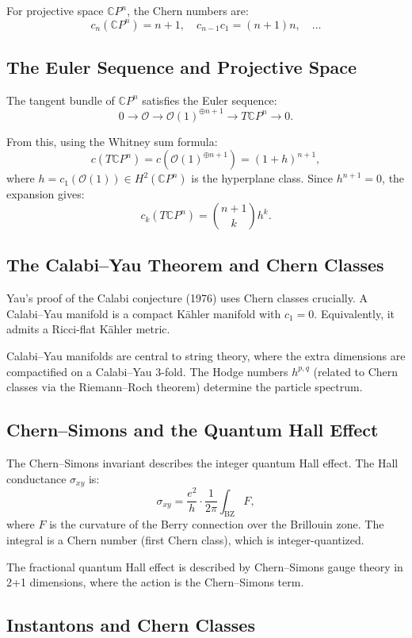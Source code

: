 For projective space $\mathbb{C}P^n$, the Chern numbers are:
\[
c_n(\mathbb{C}P^n) = n+1, \quad c_{n-1}c_1 = (n+1)n, \quad \ldots
\]

\subsection{The Euler Sequence and Projective Space}

The tangent bundle of $\mathbb{C}P^n$ satisfies the Euler sequence:
\[
0 \to \mathcal{O} \to \mathcal{O}(1)^{\oplus n+1} \to T\mathbb{C}P^n \to 0.
\]

From this, using the Whitney sum formula:
\[
c(T\mathbb{C}P^n) = c(\mathcal{O}(1)^{\oplus n+1}) = (1 + h)^{n+1},
\]
where $h = c_1(\mathcal{O}(1)) \in H^2(\mathbb{C}P^n)$ is the hyperplane class. Since $h^{n+1} = 0$, the expansion gives:
\[
c_k(T\mathbb{C}P^n) = \binom{n+1}{k} h^k.
\]

\subsection{The Calabi--Yau Theorem and Chern Classes}

Yau's proof of the Calabi conjecture (1976) uses Chern classes crucially. A Calabi--Yau manifold is a compact K\"{a}hler manifold with $c_1 = 0$. Equivalently, it admits a Ricci-flat K\"{a}hler metric.

Calabi--Yau manifolds are central to string theory, where the extra dimensions are compactified on a Calabi--Yau 3-fold. The Hodge numbers $h^{p,q}$ (related to Chern classes via the Riemann--Roch theorem) determine the particle spectrum.

\subsection{Chern--Simons and the Quantum Hall Effect}

The Chern--Simons invariant describes the integer quantum Hall effect. The Hall conductance $\sigma_{xy}$ is:
\[
\sigma_{xy} = \frac{e^2}{h} \cdot \frac{1}{2\pi} \int_{\text{BZ}} F,
\]
where $F$ is the curvature of the Berry connection over the Brillouin zone. The integral is a Chern number (first Chern class), which is integer-quantized.

The fractional quantum Hall effect is described by Chern--Simons gauge theory in 2+1 dimensions, where the action is the Chern--Simons term.

\subsection{Instantons and Chern Classes}

